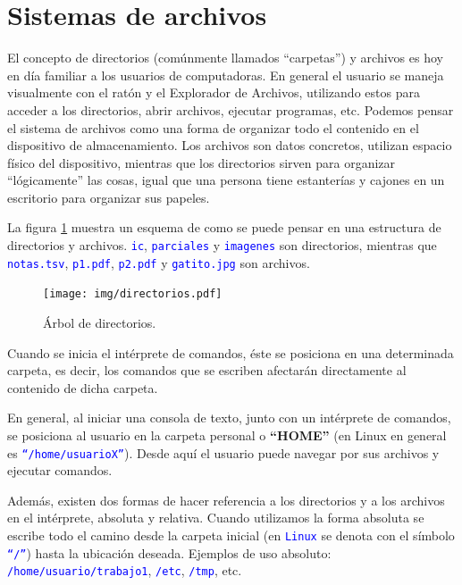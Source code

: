 \documentclass[12pt]{article}
\newcommand{\cw}[1]{\texttt{\textcolor{blue}{#1}}}
\begin{document}
\section{Sistemas de archivos}

\label{sec:sistemaDeArchivos}

El concepto de directorios (comúnmente llamados ``carpetas'') y archivos es
hoy en día familiar a los usuarios de computadoras. En general el usuario se
maneja visualmente con el ratón y el Explorador de Archivos, utilizando estos
para acceder a los directorios, abrir archivos, ejecutar programas, etc.
Podemos pensar el sistema de archivos como una forma de organizar todo el
contenido en el dispositivo de almacenamiento. Los archivos son datos
concretos, utilizan espacio físico del dispositivo, mientras que los
directorios sirven para organizar ``lógicamente'' las cosas, igual que una
persona tiene estanterías y cajones en un escritorio para organizar sus
papeles.

La figura \ref{arbolDirectorios} muestra un esquema de como se puede pensar en
una estructura de directorios y archivos. \cw{ic}, \cw{parciales} y
\cw{imagenes} son directorios, mientras que \cw{notas.tsv}, \cw{p1.pdf},
\cw{p2.pdf} y \cw{gatito.jpg} son archivos.

\begin{figure}[!htb]

    \centering

    \texttt{[image: img/directorios.pdf]}

    \caption{Árbol de directorios.}

    \label{arbolDirectorios}

\end{figure}

Cuando se inicia el intérprete de comandos, éste se posiciona en una
determinada carpeta, es decir, los comandos que se escriben afectarán
directamente al contenido de dicha carpeta.

En general, al iniciar una consola de texto, junto con un intérprete de
comandos, se posiciona al usuario en la carpeta personal o \textbf{``HOME''}
(en Linux en general es \cw{``/home/usuarioX''}). Desde aquí el usuario
puede navegar por sus archivos y ejecutar comandos.

Además, existen dos formas de hacer referencia a los directorios y a los
archivos en el intérprete, absoluta y relativa. Cuando utilizamos la forma
absoluta se escribe todo el camino desde la carpeta inicial (en \cw{Linux}
se denota con el símbolo \cw{``/''}) hasta la ubicación deseada. Ejemplos de
uso absoluto: \cw{/home/usuario/trabajo1}, \cw{/etc}, \cw{/tmp}, etc.
\end{document}
